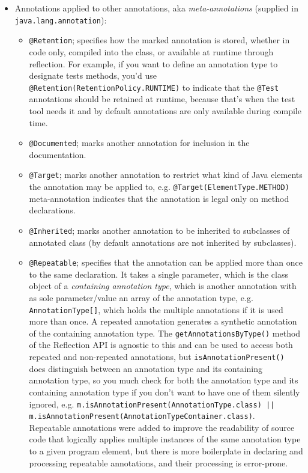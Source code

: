 \documentclass[table, xcdraw]{article}%
\begin{document}
\begin{itemize}
    \item Annotations applied to other annotations, aka \emph{meta-annotations} (supplied in \texttt{java.lang.annotation}):
    \begin{itemize}
        \item \texttt{@Retention}; specifies how the marked annotation is stored, whether in code only, compiled into the class, or available at runtime through reflection. For example, if you want to define an annotation type to designate tests methods, you'd use \texttt{@Retention(RetentionPolicy.RUNTIME)} to indicate that the \texttt{@Test} annotations should be retained at runtime, because that's when the test tool needs it and by default annotations are only available during compile time.
        \item \texttt{@Documented}; marks another annotation for inclusion in the documentation.
        \item \texttt{@Target}; marks another annotation to restrict what kind of Java elements the annotation may be applied to, e.g. \texttt{@Target(ElementType.METHOD)} meta-annotation indicates that the annotation is legal only on method declarations.
        \item \texttt{@Inherited}; marks another annotation to be inherited to subclasses of annotated class (by default annotations are not inherited by subclasses).
        \item \texttt{@Repeatable}; specifies that the annotation can be applied more than once to the same declaration. It takes a single parameter, which is the class object of a \emph{containing annotation type}, which is another annotation with as sole parameter/value an array of the annotation type, e.g. \texttt{AnnotationType[]}, which holds the multiple annotations if it is used more than once. A repeated annotation generates a synthetic annotation of the containing annotation type. The \texttt{getAnnotationsByType()} method of the Reflection API is agnostic to this and can be used to access both repeated and non-repeated annotations, but \texttt{isAnnotationPresent()} does distinguish between an annotation type and its containing annotation type, so you much check for both the annotation type and its containing annotation type if you don't want to have one of them silently ignored, e.g. \texttt{m.isAnnotationPresent(AnnotationType.class) || m.isAnnotationPresent(AnnotationTypeContainer.class)}.\\
        Repeatable annotations were added to improve the readability of source code that logically applies multiple instances of the same annotation type to a given program element, but there is more boilerplate in declaring and processing repeatable annotations, and their processing is error-prone.
    \end{itemize}
\end{itemize}
\end{document}
